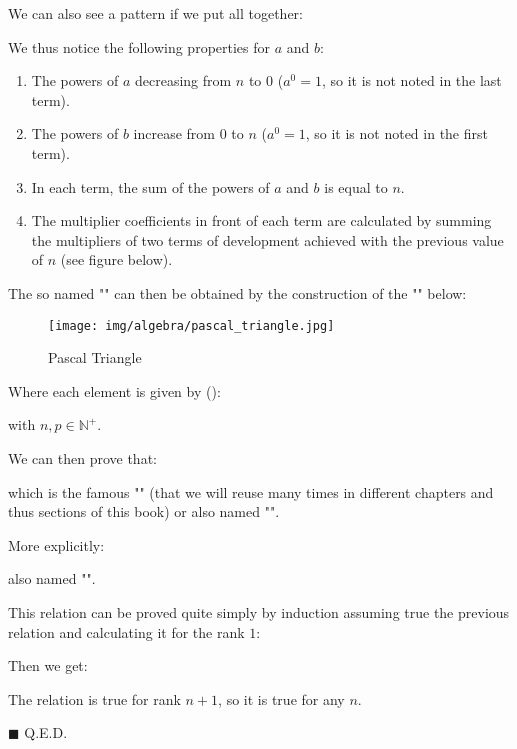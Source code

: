 	We can also see a pattern if we put all together:
	
	We thus notice the following properties for $a$ and $b$:
	\begin{enumerate}
		\item The powers of $a$ decreasing from $n$ to $0$ ($a^0=1$, so it is not noted in the last term).
		
		\item The powers of $b$ increase from $0$ to $n$ ($a^0=1$, so it is not noted in the first term).
		
		\item In each term, the sum of the powers of $a$ and $b$ is equal to $n$.
		
		\item The multiplier coefficients in front of each term are calculated by summing the multipliers of two terms of development achieved with the previous value of $n$ (see figure below).
	\end{enumerate}
	The so named "" can then be obtained by the construction of the "\label{Pascal's triangle}" below:
	\begin{figure}[H]
		\centering
		\texttt{[image: img/algebra/pascal\_triangle.jpg]}
		\caption{Pascal Triangle}
	\end{figure}
	Where each element is given by ():
	
	with $n,p\in \mathbb{N}^{+}$.
	\begin{theorem}
	We can then prove that\label{binomial theorem}:
	
	which is the famous "" (that we will reuse many times in different chapters and thus sections of this book) or also named "".
	
	More explicitly\label{binomial coefficient development}:
	
	also named "".
	\end{theorem}
	\begin{dem}
	This relation can be proved quite simply by induction assuming true the previous relation and calculating it for the rank $1$:
	
	Then we get:
	
	The relation is true for rank $n + 1$, so it is true for any $n$.
	\begin{flushright}
		$\blacksquare$  Q.E.D.
	\end{flushright}
	\end{dem} 
	

